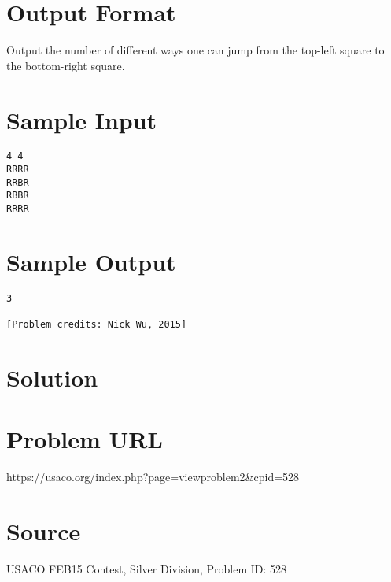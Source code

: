 \documentclass[12pt]{article}
\begin{document}
\section*{Output Format}
Output the number of different ways one can jump from the top-left square to the bottom-right square.

\section*{Sample Input}
\begin{verbatim}
4 4
RRRR
RRBR
RBBR
RRRR
\end{verbatim}

\section*{Sample Output}
\begin{verbatim}
3

[Problem credits: Nick Wu, 2015]
\end{verbatim}

\section*{Solution}


\section*{Problem URL}
https://usaco.org/index.php?page=viewproblem2&cpid=528

\section*{Source}
USACO FEB15 Contest, Silver Division, Problem ID: 528
\end{document}
